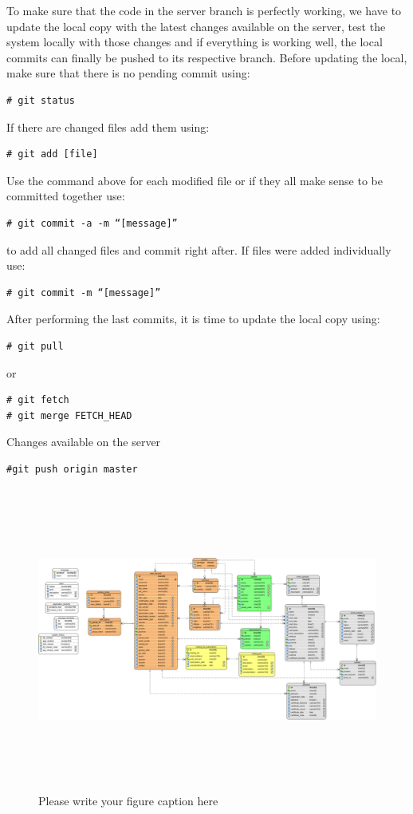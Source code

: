 \documentclass[envcountsame,envcountchap]{svmono}
\begin{document}
To make sure that the code in the server branch is perfectly working, we have to update the local copy with the latest changes available on the server, test the system locally with those changes and if everything is working well, the local commits can finally be pushed to its respective branch. Before updating the local, make sure that there is no pending commit using:
\begin{verbatim}
# git status
\end{verbatim}
If there are changed files add them using:
\begin{verbatim}
# git add [file]
\end{verbatim}
Use the command above for each modified file or if they all make sense to be committed together use:
\begin{verbatim}
# git commit -a -m “[message]”
\end{verbatim}
to add all changed files and commit right after. If files were added individually use:
\begin{verbatim}
# git commit -m “[message]”
\end{verbatim}
After performing the last commits, it is time to update the local copy using:
\begin{verbatim}
# git pull
\end{verbatim}
or
\begin{verbatim}
# git fetch
# git merge FETCH_HEAD
\end{verbatim}

Changes available on the server
\begin{verbatim}
#git push origin master
\end{verbatim}

\begin{figure}
\centering
\includegraphics[height=10cm, angle=90]{figures/relational-model}
\caption{Please write your figure caption here}
\label{fig:1}
\end{figure}

\backmatter

\printindex
\end{document}
